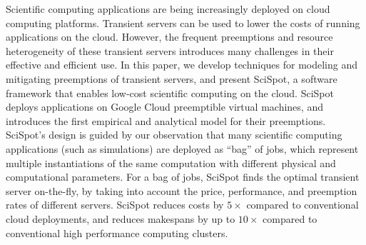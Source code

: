 Scientific computing applications are being increasingly deployed on cloud computing platforms.
Transient servers can be used to lower the costs of running applications on the cloud.
However, the frequent preemptions and resource heterogeneity of these transient servers introduces many challenges in their effective and efficient use.
%
In this paper, we develop techniques for modeling and mitigating preemptions of transient servers, and present SciSpot, a software framework that enables low-cost scientific computing on the cloud. 
%
SciSpot deploys applications on Google Cloud preemptible virtual machines, and introduces the first empirical and analytical model for their preemptions. 
SciSpot's design is guided by our observation that many scientific computing applications (such as simulations) are deployed as ``bag'' of jobs, which represent multiple instantiations of the same computation with different physical and computational parameters. 
For a bag of jobs, SciSpot finds the optimal transient server on-the-fly, by taking into account the price, performance, and preemption rates of different servers. 
SciSpot reduces costs by $5\times$ compared to conventional cloud deployments, and reduces  makespans by up to $10\times$ compared to conventional high performance computing clusters.


%








